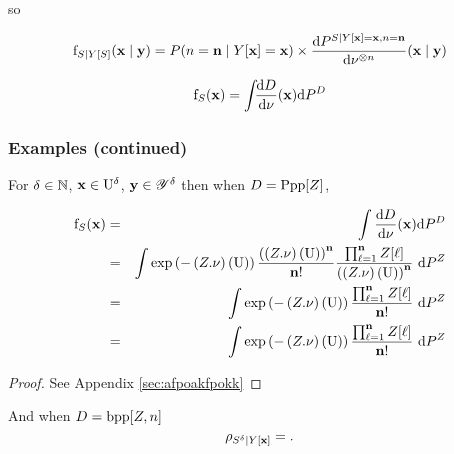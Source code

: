 so 


$$\mathrm{f}_{S\mid Y[S]}(\mathbf{x}\mid\mathbf{y})=
P(n=\mathbf{n}\mid Y[\mathbf{x}]=\mathbf{x})\times \frac{\mathrm{d} P^{S\mid Y[\mathbf{x}]=\mathbf{x}, n=\mathbf{n}}}{\mathrm{d}\nu^{\otimes n}}(\mathbf{x}\mid\mathbf{y})$$ 


\begin{eqnarray*}
\mathrm{f}_{S}(\mathbf{x})=
\int_{}\frac{\mathrm{d}D}
{\mathrm{d}\nu}(\mathbf{x})\mathrm{d} P^D
\end{eqnarray*}


\subsubsection*{Examples (continued)}

For $\delta\in\mathbb{N}$, $\mathbf{x}\in \mathrm{U}^\delta$, $\mathbf{y}\in\mathscr{Y}^\delta$ then 
when $D=\mathrm{Ppp}[Z]$,  

\begin{eqnarray*}
\density_{\Sample}(\position)&=&
\int\frac{\derive\Design}
{\derive\dominantU}(\position)\derive P^\Design\\
&=&
\int \exp\left(-\left(\Desvar.\dominantU\right)(\Pop)\right)
\frac{\left(\left(\Desvar.\dominantU\right)(\Pop)\right)^{\samplesize}}{\samplesize!}
\frac{\prod_{\ell=1}^{\samplesize}
\Desvar[\ell]}{\left(\left(\Desvar.\dominantU\right)(\Pop)\right)^{\samplesize}}
~\derive P^\Desvar\\
&=&
\int \exp\left(-\left(\Desvar.\dominantU\right)(\Pop)\right)
\frac{\prod_{\ell=1}^{\samplesize}
\Desvar[\ell]}%
{\samplesize!}
~\derive P^\Desvar\\
&=&
\int \exp\left(-\left(\Desvar.\dominantU\right)(\Pop)\right)
\frac{\prod_{\ell=1}^{\samplesize}
\Desvar[\ell]}%
{\samplesize!}
~\derive P^\Desvar
\end{eqnarray*}
\begin{proof}
See Appendix \ref{sec:afpoakfpokk}
\end{proof}
And 
when $D=\mathrm{bpp}[Z,n]$ 
\begin{equation}
\rho_{S^\delta\mid Y[\mathbf{x}]}=.
\end{equation}
